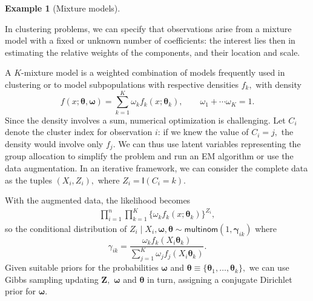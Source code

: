 \documentclass[
  11pt,
  letterpaper,
]{scrbook}
\theoremstyle{plain}
\theoremstyle{definition}
\theoremstyle{definition}
\newtheorem{example}{Example}[chapter]
\theoremstyle{plain}
\theoremstyle{plain}
\theoremstyle{definition}
\theoremstyle{remark}
\begin{document}
\begin{example}[Mixture
models]\protect\hypertarget{exm-mixture}{}\label{exm-mixture}

In clustering problems, we can specify that observations arise from a
mixture model with a fixed or unknown number of coefficients: the
interest lies then in estimating the relative weights of the components,
and their location and scale.

A \(K\)-mixture model is a weighted combination of models frequently
used in clustering or to model subpopulations with respective densities
\(f_k,\) with density
\[f(x; \boldsymbol{\theta}, \boldsymbol{\omega}) = \sum_{k=1}^K \omega_kf_k(x; \boldsymbol{\theta}_k), \qquad \omega_1 + \cdots \omega_K=1.\]
Since the density involves a sum, numerical optimization is challenging.
Let \(C_i\) denote the cluster index for observation \(i\): if we knew
the value of \(C_i =j,\) the density would involve only \(f_j.\) We can
thus use latent variables representing the group allocation to simplify
the problem and run an EM algorithm or use the data augmentation. In an
iterative framework, we can consider the complete data as the tuples
\((X_i, Z_i),\) where \(Z_i = \mathsf{I}(C_i=k).\)

With the augmented data, the likelihood becomes \begin{align*}
\prod_{i=1}^n \prod_{k=1}^K \{\omega_kf_k(x; \boldsymbol{\theta}_k)\}^{Z_i},
\end{align*} so the conditional distribution of
\(Z_i \mid X_i, \boldsymbol{\omega}, \boldsymbol{\theta} \sim \mathsf{multinom}(1, \boldsymbol{\gamma}_{ik})\)
where
\[\gamma_{ik} = \frac{\omega_k f_k(X_i\boldsymbol{\theta}_k)}{\sum_{j=1}^K \omega_jf_j(X_i\boldsymbol{\theta}_k)}.\]
Given suitable priors for the probabilities \(\boldsymbol{\omega}\) and
\(\boldsymbol{\theta} \equiv \{\boldsymbol{\theta}_1, \ldots, \boldsymbol{\theta}_k\},\)
we can use Gibbs sampling updating \(\boldsymbol{Z},\)
\(\boldsymbol{\omega}\) and \(\boldsymbol{\theta}\) in turn, assigning a
conjugate Dirichlet prior for \(\boldsymbol{\omega}.\)

\end{example}
\end{document}
